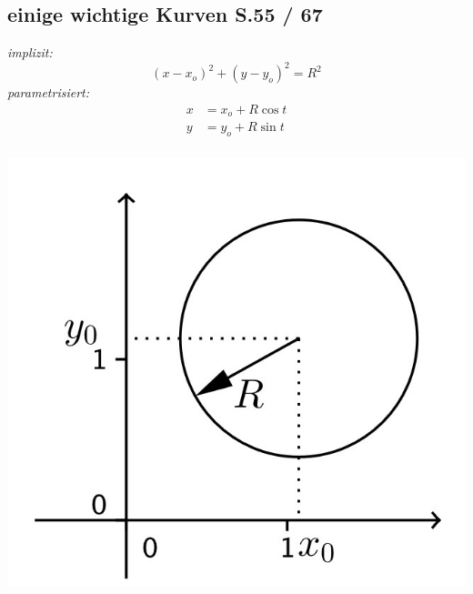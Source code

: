 \subsection{einige wichtige Kurven \texorpdfstring{\hfill S.55 / 67}{S.55 /67}}
\vspace{3pt}
\vspace{3pt}
\begin{minipage}{0.5\linewidth}
        \vspace{0.5em}
        \textit{implizit:}
        $$
            (x - x_o)^2  + (y - y_o)^2 = R^2
        $$
        \textit{parametrisiert:}
        \begin{align*}
            x &= x_o + R\cos{t}\\
            y &= y_o + R\sin{t}\\
        \end{align*}
\end{minipage}
\begin{minipage}{0.49\linewidth}
        \includegraphics[width=0.8\linewidth]{src/Appendix/Kreis.jpg}
\end{minipage}
    
